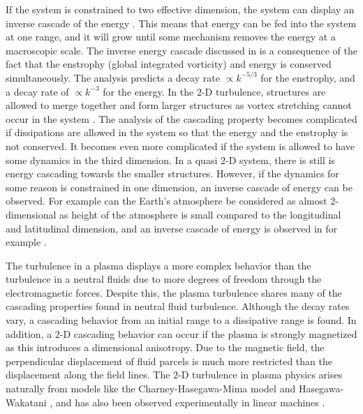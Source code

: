 If the system is constrained to two effective dimension, the system can display an inverse cascade of the energy \cite{Kraichan1980}.
This means that energy can be fed into the system at one range, and it will grow until some mechanism removes the energy at a macroscopic scale.
The inverse energy cascade discussed in \cite{Kraichan1980} is a consequence of the fact that the enstrophy (global integrated vorticity) and energy is conserved simultaneously.
The analysis predicts a decay rate $\propto k^{-5/3}$ for the enstrophy, and a decay rate of $\propto k^{-3}$ for the energy.
In the $2$-D turbulence, structures are allowed to merge together and form larger structures as vortex stretching cannot occur in the system \cite{Fjortoft1953}.
The analysis of the cascading property becomes complicated if dissipations are allowed in the system so that the energy and the enstrophy is not conserved.
It becomes even more complicated if the system is allowed to have some dynamics in the third dimension.
In a quasi $2$-D system, there is still is energy cascading towards the smaller structures.
However, if the dynamics for some reason is constrained in one dimension, an inverse cascade of energy can be observed.
For example can the Earth's atmosphere be considered as almost $2$-dimensional as height of the atmosphere is small compared to the longitudinal and latitudinal dimension, and an inverse cascade of energy is observed in for example \cite{Smith2002}.

The turbulence in a plasma displays a more complex behavior than the turbulence in a neutral fluids due to more degrees of freedom through the electromagnetic forces.
Despite this, the plasma turbulence shares many of the cascading properties found in neutral fluid turbulence.
Although the decay rates vary, a cascading behavior from an initial range to a dissipative range is found.
In addition, a $2$-D cascading behavior can occur if the plasma is strongly magnetized as this introduces a dimensional anisotropy.
Due to the magnetic field, the perpendicular displacement of fluid parcels is much more restricted than the displacement along the field lines.
The $2$-D turbulence in plasma physics arises naturally from models like the Charney-Hasegawa-Mima model \cite{Boffetta2002} and Hasegawa-Wakatani \cite{Manz2009}, and has also been observed experimentally in linear machines \cite{Tynan2006a}.


